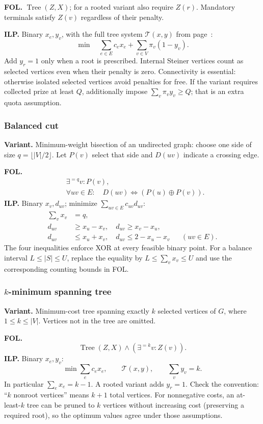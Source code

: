 \textbf{FOL.} $\operatorname{Tree}(Z,X)$; for a rooted variant also require
$Z(r)$. Mandatory terminals satisfy $Z(v)$ regardless of their penalty.

\textbf{ILP.} Binary $x_e,y_v$, with the full tree system
$\mathcal T(x,y)$ from page~\pageref{form:tree-template}:
\[
 \min\quad\sum_{e\in E}c_ex_e+\sum_{v\in V}\pi_v(1-y_v).
\]
Add $y_r=1$ only when a root is prescribed. Internal Steiner vertices count
as selected vertices even when their penalty is zero. Connectivity is
essential: otherwise isolated selected vertices avoid penalties for free.
If the variant requires collected prize at least $Q$, additionally impose
$\sum_v\pi_vy_v\ge Q$; that is an extra quota assumption.

\subsubsection{Balanced cut}\label{form:cut}
\textbf{Variant.} Minimum-weight bisection of an undirected graph: choose
one side of size $q=\lfloor |V|/2\rfloor$. Let $P(v)$ select that side and
$D(uv)$ indicate a crossing edge.

\textbf{FOL.}
\[
\begin{aligned}
 &\exists^{=q}v:P(v),\\
 &\forall uv\in E:\quad D(uv)\Leftrightarrow(P(u)\mathbin\oplus P(v)).
\end{aligned}
\]
\textbf{ILP.} Binary $x_v,d_{uv}$; minimize $\sum_{uv\in E}c_{uv}d_{uv}$:
\[
\begin{aligned}
 \sum_v x_v&=q,\\
 d_{uv}&\ge x_u-x_v,\quad d_{uv}\ge x_v-x_u,\\
 d_{uv}&\le x_u+x_v,\quad d_{uv}\le2-x_u-x_v
                         &&(uv\in E).
\end{aligned}
\]
The four inequalities enforce XOR at every feasible binary point.
For a balance interval $L\le |S|\le U$, replace the equality by
$L\le\sum_vx_v\le U$ and use the corresponding counting bounds in FOL.

\subsubsection{\texorpdfstring{$k$}{k}-minimum spanning tree}\label{form:kmst}
\textbf{Variant.} Minimum-cost tree spanning exactly $k$ selected vertices
of $G$, where $1\le k\le |V|$. Vertices not in the tree are omitted.

\textbf{FOL.}
\[
 \operatorname{Tree}(Z,X)\land(\exists^{=k}v:Z(v)).
\]
\textbf{ILP.} Binary $x_e,y_v$:
\[
 \min\sum_e c_ex_e,\qquad
 \mathcal T(x,y),\qquad \sum_v y_v=k.
\]
In particular $\sum_ex_e=k-1$. A rooted variant adds $y_r=1$.
Check the convention: ``$k$ nonroot vertices'' means $k+1$ total vertices.
For nonnegative costs, an at-least-$k$ tree can be pruned to $k$ vertices
without increasing cost (preserving a required root), so the optimum values
agree under those assumptions.

